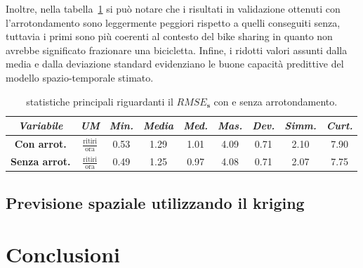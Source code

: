Inoltre, nella tabella~\ref{statistiche_RMSE_s} si può notare che i risultati in validazione ottenuti con l'arrotondamento sono leggermente peggiori rispetto a quelli conseguiti senza, tuttavia i primi sono più coerenti al contesto del bike sharing in quanto non avrebbe significato frazionare una bicicletta. Infine, i ridotti valori assunti dalla media e dalla deviazione standard evidenziano le buone capacità predittive del modello spazio-temporale stimato.

\begin{table}[htpb]
	\centering
	\renewcommand\arraystretch{1.5}
	\begin{tabular}{c|c|c|c|c|c|c|c|c}
		\hline
		\textit{Variabile} & \textit{UM} & \textit{Min.} & \textit{Media} & \textit{Med.} & \textit{Mas.} & \textit{Dev.} & \textit{Simm.}  & \textit{Curt.} \\
		\hline
		\textbf{Con arrot.} & $\frac{\text{ritiri}}{\text{ora}}$ & \num{0.53} & \num{1.29} & \num{1.01} & \num{4.09} & \num{0.71} & \num{2.10} & \num{7.90} \\
		\hline
		\textbf{Senza arrot.} & $\frac{\text{ritiri}}{\text{ora}}$ & \num{0.49} & \num{1.25} & \num{0.97} & \num{4.08} & \num{0.71} & \num{2.07} & \num{7.75} \\
		\hline
	\end{tabular}
	\caption[Statistiche principali riguardanti il $RMSE_\mathbf{s}$ con e senza arrotondamento]{statistiche principali riguardanti il $RMSE_\mathbf{s}$ con e senza arrotondamento.}
	\label{statistiche_RMSE_s}
\end{table} 

\subsection{Previsione spaziale utilizzando il kriging}

\section{Conclusioni}

